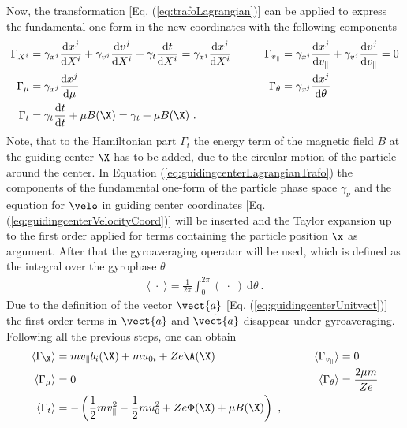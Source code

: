 Now, the transformation [Eq. (\ref{eq:trafoLagrangian})] can be applied to express the fundamental one-form in the new coordinates with the following components
\begin{gather}
    \begin{aligned}
        \Gamma_{X^i} &= \gamma_{x^j} \frac{\mathrm{d}x^j}{\mathrm{d}X^i} + \gamma_{v^j} \frac{\mathrm{d}v^j}{\mathrm{d}X^i} + \gamma_{t} \frac{\mathrm{d}t}{\mathrm{d}X^i} = \gamma_{x^j} \frac{\mathrm{d}x^j}{\mathrm{d}X^i} &\qquad \Gamma_{v_\parallel} &= \gamma_{x^j} \frac{\mathrm{d}x^j}{\mathrm{d}v_\parallel} + \gamma_{v^j} \frac{\mathrm{d}v^j}{\mathrm{d}v_\parallel} = 0 \\
        \Gamma_{\mu} &= \gamma_{x^j} \frac{\mathrm{d}x^j}{\mathrm{d}\mu}                                                                                                                                                      &\qquad \Gamma_{\theta}      &= \gamma_{x^j} \frac{\mathrm{d}x^j}{\mathrm{d}\theta}\\
        \Gamma_{t}   &= \gamma_{t} \frac{\mathrm{d}t}{\mathrm{d}t} + \mu B(\X) = \gamma_t + \mu B(\X) ~. & & \\
    \end{aligned}
    \label{eq:guidingcenterLagrangianTrafo}
\end{gather}
Note, that to the Hamiltonian part $\Gamma_t$ the energy term of the magnetic field $B$ at the guiding center $\X$ has to be added, due to the circular motion of the particle around the center.
\newpage
In Equation (\ref{eq:guidingcenterLagrangianTrafo}) the components of the fundamental one-form of the particle phase space $\gamma_\nu$ and the equation for $\velo$ in guiding center coordinates [Eq. (\ref{eq:guidingcenterVelocityCoord})] will be inserted and the Taylor expansion up to the first order applied for terms containing the particle position $\x$ as argument. After that the gyroaveraging operator will be used, which is defined as the integral over the gyrophase $\theta$
\begin{gather}
    \langle \;\cdot\; \rangle = \frac{1}{2\pi} \int_{0}^{2\pi} (\;\cdot\;)~\mathrm{d}\theta~.
    \label{eq:gyroaveraging}
\end{gather}
Due to the definition of the vector $\vect{a}$ [Eq. (\ref{eq:guidingcenterUnitvect})] the first order terms in $\vect{a}$ and $\dot{\vect{a}}$ disappear under gyroaveraging. Following all the previous steps, one can obtain
\begin{gather}
    \begin{aligned}
        \langle \Gamma_{\X} \rangle &= m v_\parallel b_i(\X) + mu_{0i} + Ze\A(\X) &\qquad \langle \Gamma_{v_\parallel} \rangle &= 0 \\
        \langle \Gamma_{\mu} \rangle &= 0                                           &\qquad \langle \Gamma_{\theta}      \rangle &= \frac{2\mu m}{Ze}\\
        \langle \Gamma_{t}   \rangle &= - \left(\frac{1}{2}mv_\parallel^2 - \frac{1}{2}mu_0^2 + Ze\Phi(\X) + \mu B(\X) \right) ~, & & \\
    \end{aligned}
    \label{eq:guidingcenterLagrangianTrafoAverage}
\end{gather}
